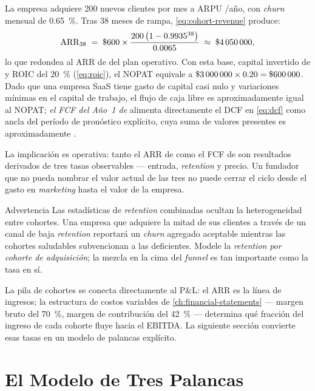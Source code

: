 \begin{example}
La empresa adquiere \num{200} nuevos clientes por mes a ARPU /año, con \emph{churn}
mensual de \qty{0.65}{\percent}. Tras \num{38} meses de rampa, \cref{eq:cohort-revenue} produce:
\[
  \mathrm{ARR}_{38}
  \;=\; \$\num{600}\times
        \frac{200\,\bigl(1-0.9935^{38}\bigr)}{0.0065}
  \;\approx\; \$\num{4050000},
\]
lo que redondea al ARR de  del plan operativo. Con esta base, capital invertido
de  y ROIC del \qty{20}{\percent} (\cref{eq:roic}), el NOPAT equivale a
\(\$\num{3000000}\times 0.20=\$\num{600000}\). Dado que una empresa SaaS tiene gasto de capital
casi nulo y variaciones mínimas en el capital de trabajo, el flujo de caja libre es
aproximadamente igual al NOPAT; \emph{el FCF del Año~1 de } alimenta directamente
el DCF en \cref{eq:dcf} como ancla del período de pronóstico explícito, cuya suma de valores
presentes es aproximadamente .

La implicación es operativa: tanto el ARR de  como el FCF de  son
resultados derivados de tres tasas observables --- entrada, \emph{retention} y precio. Un
fundador que no pueda nombrar el valor actual de las tres no puede cerrar el ciclo desde el
gasto en \emph{marketing} hasta el valor de la empresa.
\end{example}

\begin{admonition}{Advertencia}
Las estadísticas de \emph{retention} combinadas ocultan la heterogeneidad entre cohortes. Una
empresa que adquiere la mitad de sus clientes a través de un canal de baja \emph{retention}
reportará un \emph{churn} agregado aceptable mientras las cohortes saludables subvencionan a las
deficientes. Modele la \emph{retention} \emph{por cohorte de adquisición}; la mezcla en la cima
del \emph{funnel} es tan importante como la tasa en sí.
\end{admonition}

La pila de cohortes se conecta directamente al P\&L: el ARR es la línea de ingresos; la
estructura de costos variables de \cref{ch:financial-statements} --- margen bruto del
\qty{70}{\percent}, margen de contribución del \qty{42}{\percent} --- determina qué fracción
del ingreso de cada cohorte fluye hacia el EBITDA. La siguiente sección convierte esas tasas en
un modelo de palancas explícito.


\section{El Modelo de Tres Palancas}\label{sec:three-driver-model}

